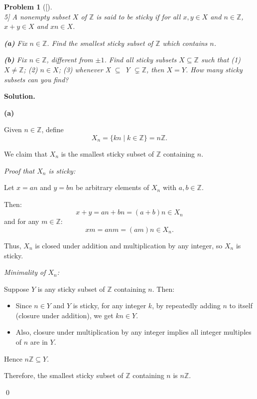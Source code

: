 \documentclass[12pt]{article}
\newtheorem{problemx}{Problem}
\newenvironment{problem}[1]{%
	\begin{problemx}[#1]\leavevmode\\[0.5em] %
	}{%
	\end{problemx}
}
\newenvironment{solution}{%
	\par\medskip
	\noindent\textbf{Solution.}\par\nopagebreak
}{%
	\hfill \qed \par\medskip
}
\begin{document}
	\begin{problem}[5]
		A nonempty subset $X$ of $\mathbb{Z}$ is said to be \textit{sticky} if for all $x, y \in X$ and $n \in \mathbb{Z}$, $x + y \in X$ and $xn \in X$.
		
		\textbf{(a)} Fix $n \in \mathbb{Z}$. Find the smallest sticky subset of $\mathbb{Z}$ which contains $n$.
		
		\textbf{(b)} Fix $n \in \mathbb{Z}$, different from $\pm1$. Find all sticky subsets $X \subseteq \mathbb{Z}$ such that (1) $X \neq \mathbb{Z}$; (2) $n \in X$; (3) whenever X $\subseteq$ Y $\subsetneq \mathbb{Z}$, then $X = Y$. How many sticky subsets can you find? 
	\end{problem}
	
	\begin{solution}
		
		\textbf{(a)}
		
		Given $n \in \mathbb{Z}$, define 
		\[
		X_n = \{ k n \mid k \in \mathbb{Z} \} = n \mathbb{Z}.
		\]
		
		We claim that $X_n$ is the smallest sticky subset of $\mathbb{Z}$ containing $n$.
		
		\textit{Proof that $X_n$ is sticky:}
		
		Let $x = a n$ and $y = b n$ be arbitrary elements of $X_n$ with $a, b \in \mathbb{Z}$.
		
		Then:
		\[
		x + y = a n + b n = (a + b) n \in X_n
		\]
		and for any $m \in \mathbb{Z}$:
		\[
		x m = a n m = (a m) n \in X_n.
		\]
		
		Thus, $X_n$ is closed under addition and multiplication by any integer, so $X_n$ is sticky.
		
		\textit{Minimality of $X_n$:}
		
		Suppose $Y$ is any sticky subset of $\mathbb{Z}$ containing $n$. Then:
		
		\begin{itemize}
			\item Since $n \in Y$ and $Y$ is sticky, for any integer $k$, by repeatedly adding $n$ to itself (closure under addition), we get $k n \in Y$.
			\item Also, closure under multiplication by any integer implies all integer multiples of $n$ are in $Y$.
		\end{itemize}
		
		Hence $n \mathbb{Z} \subseteq Y$.
		
		Therefore, the smallest sticky subset of $\mathbb{Z}$ containing $n$ is $n \mathbb{Z}$.
		

\end{solution}
\end{document}
